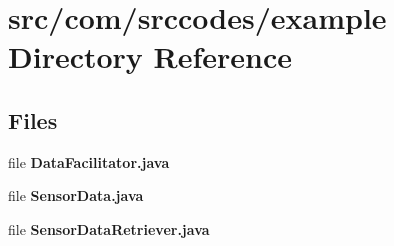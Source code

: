 \section{src/com/srccodes/example Directory Reference}
\label{dir_1bdccd930f653277825223eaa5e36b12}
\subsection*{Files}
\begin{DoxyCompactItemize}
\item 
file {\bf Data\-Facilitator.\-java}
\item 
file {\bf Sensor\-Data.\-java}
\item 
file {\bf Sensor\-Data\-Retriever.\-java}
\end{DoxyCompactItemize}
